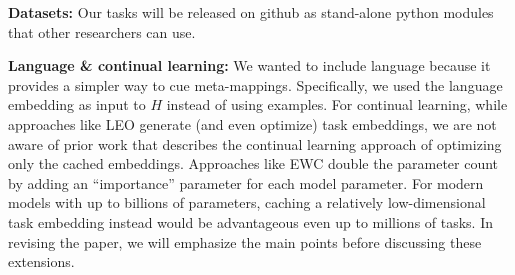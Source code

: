 \documentclass{article}
\begin{document}
\textbf{Datasets:} Our tasks will be released on github as stand-alone python modules that other researchers can use. \par
{}
\textbf{Language \& continual learning:} We wanted to include language because it provides a simpler way to cue meta-mappings. Specifically, we used the language embedding as input to $H$ instead of using examples. For continual learning, while approaches like LEO generate (and even optimize) task embeddings, we are not aware of prior work that describes the continual learning approach of optimizing only the cached embeddings. Approaches like EWC double the parameter count by adding an ``importance'' parameter for each model parameter. For modern models with up to billions of parameters, caching a relatively low-dimensional task embedding instead would be advantageous even up to millions of tasks. In revising the paper, we will emphasize the main points before discussing these extensions. 
\end{document}
